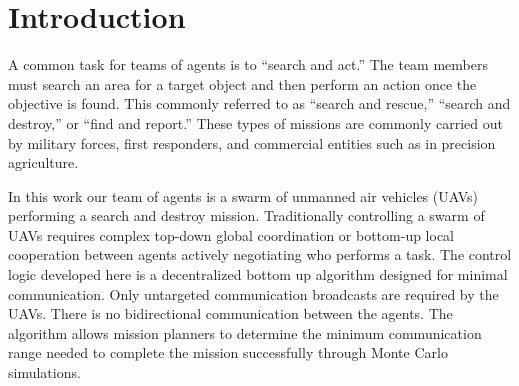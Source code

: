 \chapter{Introduction}
A common task for teams of agents is to ``search and act.''  The team members must search an area for a target object and then perform an action once the objective is found.  This commonly referred to as ``search and rescue,'' ``search and destroy,'' or ``find and report.''  These types of missions are commonly carried out by military forces, first responders, and commercial entities such as in precision agriculture.

In this work our team of agents is a swarm of unmanned air vehicles (UAVs) performing a search and destroy mission.  Traditionally controlling a swarm of UAVs requires complex top-down global coordination or bottom-up local cooperation between agents actively negotiating who performs a task.  The control logic developed here is a decentralized bottom up algorithm designed for minimal communication.  Only untargeted communication broadcasts are required by the UAVs.  There is no bidirectional communication between the agents.  The algorithm allows mission planners to determine the minimum communication range needed to complete the mission successfully through Monte Carlo simulations.  

